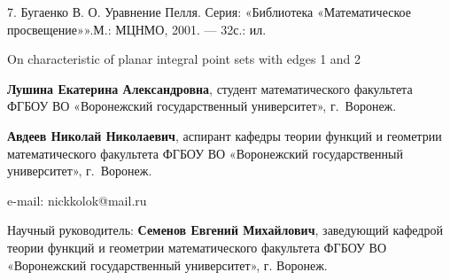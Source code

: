 \documentclass[a4paper,openbib]{article}
\begin{document}
7. Бугаенко В. О. Уравнение Пелля. Серия: «Библиотека «Математическое просвещение»».М.: МЦНМО, 2001. --- 32с.: ил.


On characteristic of planar integral point sets with edges 1 and 2

{\bf Лушина Екатерина Александровна}, студент математического факультета ФГБОУ ВО «Воронежский государственный университет», г.~Воронеж.

{\bf Авдеев Николай Николаевич}, аспирант кафедры теории функций и геометрии математического факультета ФГБОУ ВО «Воронежский государственный университет», г.~Воронеж.



e-mail: nickkolok@mail.ru

Научный руководитель:
{\bf Семенов Евгений Михайлович},
заведующий кафедрой теории функций и геометрии математического факультета ФГБОУ ВО «Воронежский государственный
университет», г. Воронеж.
\end{document}
